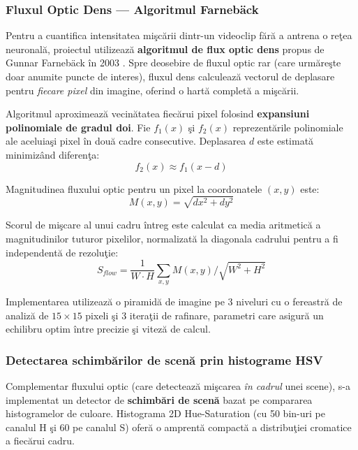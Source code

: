 \documentclass[12pt,a4paper]{article}
\begin{document}
\subsubsection{Fluxul Optic Dens --- Algoritmul Farneb\"{a}ck}

Pentru a cuantifica intensitatea mi\c{s}c\u{a}rii dintr-un videoclip f\u{a}r\u{a}{} a antrena o re\c{t}ea neuronal\u{a}, proiectul utilizeaz\u{a}{} \textbf{algoritmul de flux optic dens} propus de Gunnar Farneb\"{a}ck \^{i}n 2003 \cite{farneback2003}. Spre deosebire de fluxul optic rar (care urm\u{a}re\c{s}te doar anumite puncte de interes), fluxul dens calculeaz\u{a}{} vectorul de deplasare pentru \textit{fiecare pixel} din imagine, oferind o hart\u{a}{} complet\u{a}{} a mi\c{s}c\u{a}rii.

Algoritmul aproximeaz\u{a}{} vecin\u{a}tatea fiec\u{a}rui pixel folosind \textbf{expansiuni polinomiale de gradul doi}. Fie $f_1(x)$ \c{s}i $f_2(x)$ reprezent\u{a}rile polinomiale ale aceluia\c{s}i pixel \^{i}n dou\u{a}{} cadre consecutive. Deplasarea $d$ este estimat\u{a}{} minimiz\^{a}nd diferen\c{t}a:
\begin{equation}
    f_2(x) \approx f_1(x - d)
\end{equation}

Magnitudinea fluxului optic pentru un pixel la coordonatele $(x, y)$ este:
\begin{equation}
    M(x,y) = \sqrt{dx^2 + dy^2}
\end{equation}

Scorul de mi\c{s}care al unui cadru \^{i}ntreg este calculat ca media aritmetic\u{a}{} a magnitudinilor tuturor pixelilor, normalizat\u{a}{} la diagonala cadrului pentru a fi independent\u{a}{} de rezolu\c{t}ie:
\begin{equation}
    S_{flow} = \frac{1}{W \cdot H} \sum_{x,y} M(x,y) \bigg/ \sqrt{W^2 + H^2}
\end{equation}

Implementarea utilizeaz\u{a}{} o piramid\u{a}{} de imagine pe 3 niveluri cu o fereastr\u{a}{} de analiz\u{a}{} de $15 \times 15$ pixeli \c{s}i 3 itera\c{t}ii de rafinare, parametri care asigur\u{a}{} un echilibru optim \^{i}ntre precizie \c{s}i vitez\u{a}{} de calcul.

\subsubsection{Detectarea schimb\u{a}rilor de scen\u{a}{} prin histograme HSV}

Complementar fluxului optic (care detecteaz\u{a}{} mi\c{s}carea \textit{\^{i}n cadrul} unei scene), s-a implementat un detector de \textbf{schimb\u{a}ri de scen\u{a}} bazat pe compararea histogramelor de culoare. Histograma 2D Hue-Saturation (cu 50 bin-uri pe canalul H \c{s}i 60 pe canalul S) ofer\u{a}{} o amprent\u{a}{} compact\u{a}{} a distribu\c{t}iei cromatice a fiec\u{a}rui cadru.
\end{document}
